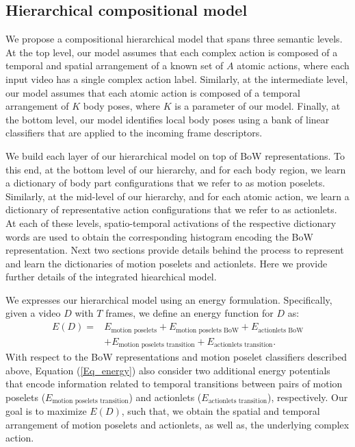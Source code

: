 \subsection{Hierarchical compositional model}

We propose a compositional hierarchical model that spans three semantic levels. 
At the top level, our model assumes that each complex action is composed of a 
temporal and spatial arrangement of a known set of $A$ atomic actions, where 
each input video has a single complex action label. Similarly, at the 
intermediate level, our model assumes that each atomic action is composed of a 
temporal arrangement of $K$ body poses, where $K$ is a parameter of 
our model. Finally, at the bottom level, our model identifies local body poses 
using a bank of linear classifiers that are applied to the incoming frame 
descriptors. 

We build each layer of our hierarchical model on top of BoW 
representations. To this end, at the bottom level of our hierarchy, and for 
each body region, we learn a dictionary of body part configurations that we 
refer to as motion poselets. Similarly, at the mid-level of our hierarchy, and 
for each atomic action, we learn a dictionary of representative action 
configurations that we refer to as actionlets. At each of these levels, 
spatio-temporal activations of the respective dictionary words are used 
to obtain the corresponding histogram encoding the BoW representation. 
Next two sections provide 
details behind the process to represent and learn the dictionaries of motion 
poselets and actionlets. Here we provide further details of the 
integrated hiearchical model.

We expresses our hierarchical model using an energy formulation. 
Specifically, given a video $D$ with $T$ frames, we
define an energy function for $D$ as:
{\small
\begin{align}\label{Eq_energy}
E(D) = & E_{\text{motion poselets}} + E_{\text{motion poselets BoW}} + 
E_{\text{actionlets BoW}} \nonumber \\ 
& + E_{\text{motion poselets transition}} + E_{\text{actionlets 
transition}}.
\end{align}}
With respect to the BoW representations and motion poselet classifiers 
described above, Equation (\ref{Eq_energy}) also 
consider two additional energy potentials that encode information related to 
temporal 
transitions between pairs of motion poselets ($E_{\text{motion poselets 
transition}}$) and 
actionlets ($E_{\text{actionlets transition}}$), respectively. Our goal is to 
maximize $E(D)$, such that, we obtain the 
spatial and temporal arrangement 
of motion poselets and actionlets, as well as, the underlying 
complex action. 


